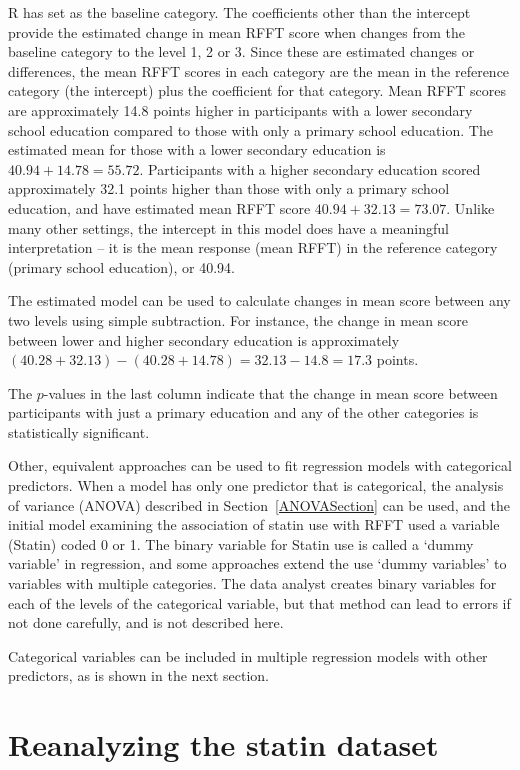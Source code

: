 \textsf{R} has set  as the baseline category. The coefficients other than the intercept provide the estimated change in mean RFFT score when  changes from the baseline category to the level 1, 2 or 3. Since these are estimated changes or differences, the mean RFFT scores in each category are the mean in the reference category (the intercept) plus the coefficient for that category. Mean RFFT scores are approximately 14.8 points higher in participants with a lower secondary school education compared to those with only a primary school education.  The estimated mean for those with a lower secondary education is $40.94 + 14.78 = 55.72$.  Participants with a higher secondary education scored approximately 32.1 points higher than those with only a primary school education, and have estimated mean RFFT score $40.94 + 32.13 = 73.07$.  Unlike many other settings, the intercept in this model does have a meaningful interpretation -- it is the mean response (mean RFFT) in the reference category (primary school education), or 40.94.

The estimated model can be used to calculate changes in mean score between any two levels using simple subtraction.  For instance, the change in mean score between lower and higher secondary education is approximately $(40.28 +32.13) - (40.28 +14.78) = 32.13 - 14.8 = 17.3$ points.

The $p$-values in the last column indicate that the change in mean score between participants with just a primary education and any of the other categories is statistically significant.

Other, equivalent approaches can be used to fit regression models with categorical predictors. When a model has only one predictor that is categorical, the analysis of variance (ANOVA) described in Section~\ref{ANOVASection} can be used, and the initial model examining the association of statin use with RFFT used a variable (Statin) coded 0 or 1. The binary variable for Statin use is called a `dummy variable' in regression, and some approaches extend the use `dummy variables' to variables with multiple categories.  The data analyst creates binary variables for each of the levels of the categorical variable, but that method can lead to errors if not done carefully, and is not described here.

Categorical variables can be included in multiple regression models with other predictors, as is shown in the next section.

\section{Reanalyzing the statin dataset}
\label{reanalyzingStatinDataSet}

